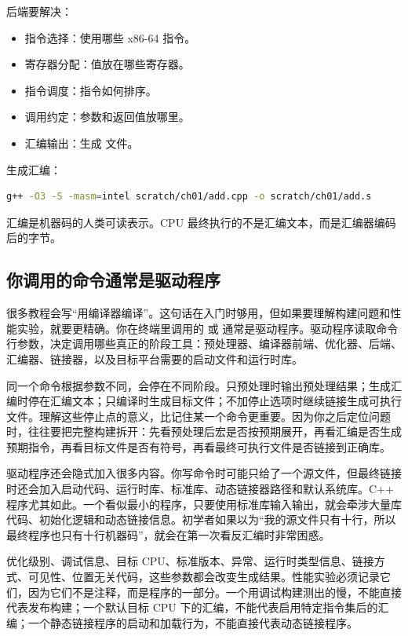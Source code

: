 后端要解决：

\begin{itemize}
  \item 指令选择：使用哪些 x86-64 指令。
  \item 寄存器分配：值放在哪些寄存器。
  \item 指令调度：指令如何排序。
  \item 调用约定：参数和返回值放哪里。
  \item 汇编输出：生成  文件。
\end{itemize}

生成汇编：

\begin{lstlisting}[language=bash]
g++ -O3 -S -masm=intel scratch/ch01/add.cpp -o scratch/ch01/add.s
\end{lstlisting}

汇编是机器码的人类可读表示。CPU 最终执行的不是汇编文本，而是汇编器编码后的字节。

\subsection{你调用的命令通常是驱动程序}

很多教程会写“用编译器编译”。这句话在入门时够用，但如果要理解构建问题和性能实验，就要更精确。你在终端里调用的  或  通常是驱动程序。驱动程序读取命令行参数，决定调用哪些真正的阶段工具：预处理器、编译器前端、优化器、后端、汇编器、链接器，以及目标平台需要的启动文件和运行时库。

同一个命令根据参数不同，会停在不同阶段。只预处理时输出预处理结果；生成汇编时停在汇编文本；只编译时生成目标文件；不加停止选项时继续链接生成可执行文件。理解这些停止点的意义，比记住某一个命令更重要。因为你之后定位问题时，往往要把完整构建拆开：先看预处理后宏是否按预期展开，再看汇编是否生成预期指令，再看目标文件是否有符号，再看最终可执行文件是否链接到正确库。

驱动程序还会隐式加入很多内容。你写命令时可能只给了一个源文件，但最终链接时还会加入启动代码、运行时库、标准库、动态链接器路径和默认系统库。C++ 程序尤其如此。一个看似最小的程序，只要使用标准库输入输出，就会牵涉大量库代码、初始化逻辑和动态链接信息。初学者如果以为“我的源文件只有十行，所以最终程序也只有十行机器码”，就会在第一次看反汇编时非常困惑。

优化级别、调试信息、目标 CPU、标准版本、异常、运行时类型信息、链接方式、可见性、位置无关代码，这些参数都会改变生成结果。性能实验必须记录它们，因为它们不是注释，而是程序的一部分。一个用调试构建测出的慢，不能直接代表发布构建；一个默认目标 CPU 下的汇编，不能代表启用特定指令集后的汇编；一个静态链接程序的启动和加载行为，不能直接代表动态链接程序。


